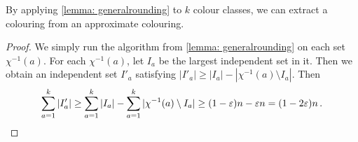 By applying \cref{lemma: generalrounding} to $k$ colour classes, we can extract a colouring from an approximate colouring.


\begin{proof}
    We simply run the algorithm from \cref{lemma: generalrounding} on each set $\chi^{-1}(a)$.
    For each $\chi^{-1}(a)$, let $I_a$ be the largest independent set in it.
    Then we obtain an independent set $I'_a$ satisfying $|I'_a| \geq |I_a| - |\chi^{-1}(a) \setminus I_a|$.
    Then 
    \[\sum_{a=1}^k |I'_a| \geq \sum_{a=1}^k |I_a| - \sum_{a=1}^k |\chi^{-1}(a) \setminus I_a| \geq (1 - \varepsilon)n - \varepsilon n = (1-2\varepsilon)n\,.\]
\end{proof}

